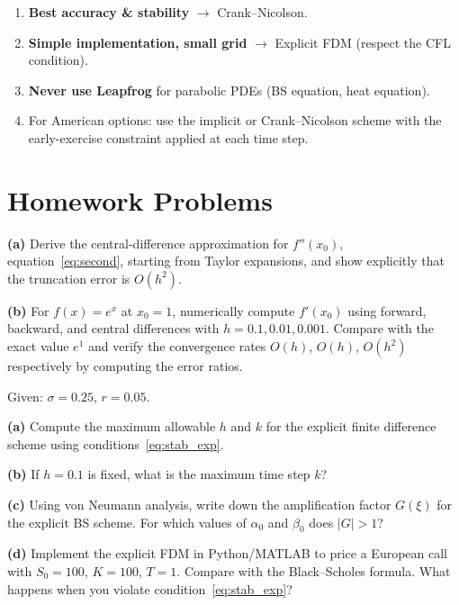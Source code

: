 \documentclass[12pt,a4paper]{article}
\theoremstyle{plain}
\theoremstyle{definition}
\theoremstyle{remark}
\begin{document}
\begin{keybox}
\begin{enumerate}
  \item \textbf{Best accuracy \& stability} $\to$ Crank--Nicolson.
  \item \textbf{Simple implementation, small grid} $\to$ Explicit FDM
        (respect the CFL condition).
  \item \textbf{Never use Leapfrog} for parabolic PDEs (BS equation,
        heat equation).
  \item For American options: use the implicit or Crank--Nicolson scheme
        with the early-exercise constraint applied at each time step.
\end{enumerate}
\end{keybox}

\section{Homework Problems}

\begin{hwbox}
\textbf{(a)} Derive the central-difference approximation for $f''(x_{0})$,
equation~\eqref{eq:second}, starting from Taylor expansions, and show
explicitly that the truncation error is $O(h^{2})$.

\textbf{(b)} For $f(x)=e^{x}$ at $x_{0}=1$, numerically compute $f'(x_{0})$
using forward, backward, and central differences with $h=0.1,0.01,0.001$.
Compare with the exact value $e^{1}$ and verify the convergence rates
$O(h)$, $O(h)$, $O(h^{2})$ respectively by computing the error ratios.
\end{hwbox}

\begin{hwbox}
Given: $\sigma=0.25$, $r=0.05$.

\textbf{(a)} Compute the maximum allowable $h$ and $k$ for the explicit
finite difference scheme using conditions~\eqref{eq:stab_exp}.

\textbf{(b)} If $h=0.1$ is fixed, what is the maximum time step $k$?

\textbf{(c)} Using von Neumann analysis, write down the amplification
factor $G(\xi)$ for the explicit BS scheme.  For which values of
$\alpha_{0}$ and $\beta_{0}$ does $|G|>1$?

\textbf{(d)} Implement the explicit FDM in Python/MATLAB to price a
European call with $S_{0}=100$, $K=100$, $T=1$.  Compare with the
Black--Scholes formula.  What happens when you violate condition~\eqref{eq:stab_exp}?
\end{hwbox}
\end{document}
